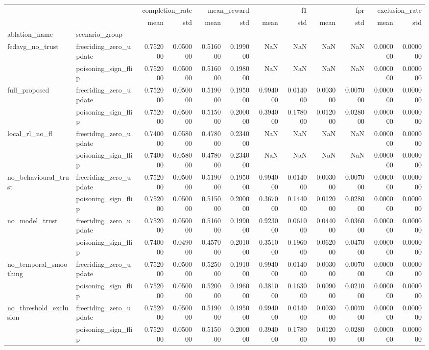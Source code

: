 \begin{tabular}{llrrrrrrrrrr}
\toprule
 &  & \multicolumn{2}{r}{completion_rate} & \multicolumn{2}{r}{mean_reward} & \multicolumn{2}{r}{f1} & \multicolumn{2}{r}{fpr} & \multicolumn{2}{r}{exclusion_rate} \\
 &  & mean & std & mean & std & mean & std & mean & std & mean & std \\
ablation_name & scenario_group &  &  &  &  &  &  &  &  &  &  \\
\midrule
\multirow[t]{2}{*}{fedavg_no_trust} & freeriding_zero_update & 0.752000 & 0.050000 & 0.516000 & 0.199000 & NaN & NaN & NaN & NaN & 0.000000 & 0.000000 \\
 & poisoning_sign_flip & 0.752000 & 0.050000 & 0.516000 & 0.198000 & NaN & NaN & NaN & NaN & 0.000000 & 0.000000 \\
\cline{1-12}
\multirow[t]{2}{*}{full_proposed} & freeriding_zero_update & 0.752000 & 0.050000 & 0.519000 & 0.195000 & 0.994000 & 0.014000 & 0.003000 & 0.007000 & 0.000000 & 0.000000 \\
 & poisoning_sign_flip & 0.752000 & 0.050000 & 0.515000 & 0.200000 & 0.394000 & 0.178000 & 0.012000 & 0.028000 & 0.000000 & 0.000000 \\
\cline{1-12}
\multirow[t]{2}{*}{local_rl_no_fl} & freeriding_zero_update & 0.740000 & 0.058000 & 0.478000 & 0.234000 & NaN & NaN & NaN & NaN & 0.000000 & 0.000000 \\
 & poisoning_sign_flip & 0.740000 & 0.058000 & 0.478000 & 0.234000 & NaN & NaN & NaN & NaN & 0.000000 & 0.000000 \\
\cline{1-12}
\multirow[t]{2}{*}{no_behavioural_trust} & freeriding_zero_update & 0.752000 & 0.050000 & 0.519000 & 0.195000 & 0.994000 & 0.014000 & 0.003000 & 0.007000 & 0.000000 & 0.000000 \\
 & poisoning_sign_flip & 0.752000 & 0.050000 & 0.515000 & 0.200000 & 0.367000 & 0.144000 & 0.012000 & 0.028000 & 0.000000 & 0.000000 \\
\cline{1-12}
\multirow[t]{2}{*}{no_model_trust} & freeriding_zero_update & 0.752000 & 0.050000 & 0.516000 & 0.199000 & 0.923000 & 0.061000 & 0.044000 & 0.036000 & 0.000000 & 0.000000 \\
 & poisoning_sign_flip & 0.740000 & 0.049000 & 0.457000 & 0.201000 & 0.351000 & 0.196000 & 0.062000 & 0.047000 & 0.000000 & 0.000000 \\
\cline{1-12}
\multirow[t]{2}{*}{no_temporal_smoothing} & freeriding_zero_update & 0.752000 & 0.050000 & 0.525000 & 0.191000 & 0.994000 & 0.014000 & 0.003000 & 0.007000 & 0.000000 & 0.000000 \\
 & poisoning_sign_flip & 0.752000 & 0.050000 & 0.520000 & 0.196000 & 0.381000 & 0.163000 & 0.009000 & 0.021000 & 0.000000 & 0.000000 \\
\cline{1-12}
\multirow[t]{2}{*}{no_threshold_exclusion} & freeriding_zero_update & 0.752000 & 0.050000 & 0.519000 & 0.195000 & 0.994000 & 0.014000 & 0.003000 & 0.007000 & 0.000000 & 0.000000 \\
 & poisoning_sign_flip & 0.752000 & 0.050000 & 0.515000 & 0.200000 & 0.394000 & 0.178000 & 0.012000 & 0.028000 & 0.000000 & 0.000000 \\
\cline{1-12}
\bottomrule
\end{tabular}
